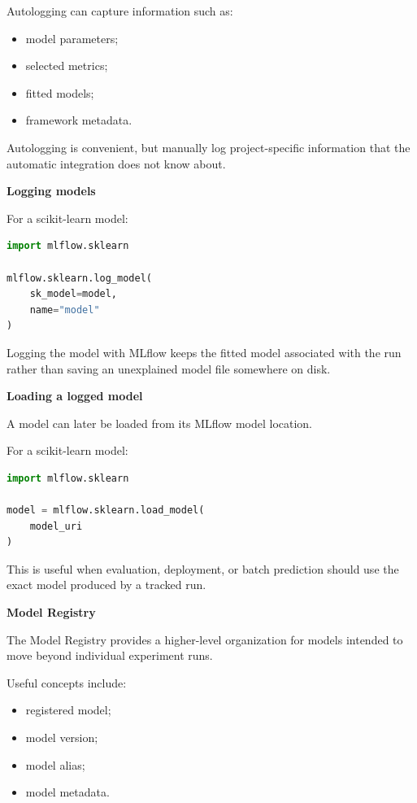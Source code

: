 \documentclass[11pt,letterpaper]{article}
\begin{document}
Autologging can capture information such as:

\begin{itemize}[leftmargin=*]
    \item model parameters;
    \item selected metrics;
    \item fitted models;
    \item framework metadata.
\end{itemize}

Autologging is convenient, but manually log project-specific information that
the automatic integration does not know about.

\textbf{Logging models}

For a scikit-learn model:

\begin{lstlisting}[language=Python]
import mlflow.sklearn

mlflow.sklearn.log_model(
    sk_model=model,
    name="model"
)
\end{lstlisting}

Logging the model with MLflow keeps the fitted model associated with the run
rather than saving an unexplained model file somewhere on disk.

\textbf{Loading a logged model}

A model can later be loaded from its MLflow model location.

For a scikit-learn model:

\begin{lstlisting}[language=Python]
import mlflow.sklearn

model = mlflow.sklearn.load_model(
    model_uri
)
\end{lstlisting}

This is useful when evaluation, deployment, or batch prediction should use the
exact model produced by a tracked run.

\textbf{Model Registry}

The Model Registry provides a higher-level organization for models intended
to move beyond individual experiment runs.

Useful concepts include:

\begin{itemize}[leftmargin=*]
    \item registered model;
    \item model version;
    \item model alias;
    \item model metadata.
\end{itemize}
\end{document}
